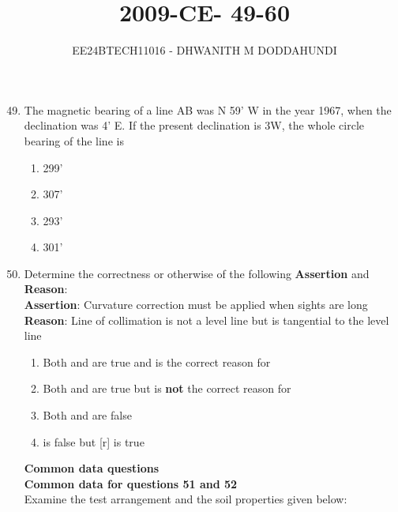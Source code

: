 \documentclass[journal]{IEEEtran}
\begin{document}

\vspace{3cm}

\title{2009-CE- 49-60}
\author{EE24BTECH11016 - DHWANITH M DODDAHUNDI}

{\let\newpage\relax\maketitle}

\renewcommand{\thefigure}{\theenumi}
\renewcommand{\thetable}{\theenumi}
\setlength{\intextsep}{10pt} %

\begin{enumerate}
\setcounter{enumi}{48}
\item The magnetic bearing of a line AB was N 59' W in the year 1967, when the declination was 4' E. If the present declination is 3\degree W, the whole circle bearing of the line is
\begin{enumerate}
    \item 299'
    \item 307'
    \item 293'
    \item 301'

\end{enumerate}
\item Determine the correctness or otherwise of the following \textbf{Assertion} and \textbf{Reason}: \\
\textbf{Assertion}: Curvature correction must be applied when sights are long \\
\textbf{Reason}: Line of collimation is not a level line but is tangential to the level line 
\begin{enumerate}
    \item Both  and  are true and  is the correct reason for 
    \item Both  and  are true but  is \textbf{not} the correct reason for 
    \item Both  and  are false
    \item {} is false but [r] is true \\
\end{enumerate} 
 \textbf{Common data questions} \\
 \textbf{Common data for questions 51 and 52} \\
 Examine the test arrangement and the soil properties given below:
\begin{figure}[H]
			\centering
			
		\end{figure}


\end{enumerate}
\end{document}

